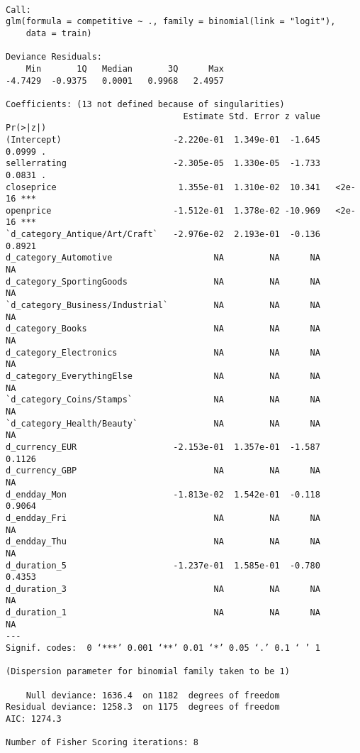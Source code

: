 \documentclass[11pt]{article}
\begin{document}
    
    \begin{verbatim}

Call:
glm(formula = competitive ~ ., family = binomial(link = "logit"), 
    data = train)

Deviance Residuals: 
    Min       1Q   Median       3Q      Max  
-4.7429  -0.9375   0.0001   0.9968   2.4957  

Coefficients: (13 not defined because of singularities)
                                   Estimate Std. Error z value Pr(>|z|)    
(Intercept)                      -2.220e-01  1.349e-01  -1.645   0.0999 .  
sellerrating                     -2.305e-05  1.330e-05  -1.733   0.0831 .  
closeprice                        1.355e-01  1.310e-02  10.341   <2e-16 ***
openprice                        -1.512e-01  1.378e-02 -10.969   <2e-16 ***
`d_category_Antique/Art/Craft`   -2.976e-02  2.193e-01  -0.136   0.8921    
d_category_Automotive                    NA         NA      NA       NA    
d_category_SportingGoods                 NA         NA      NA       NA    
`d_category_Business/Industrial`         NA         NA      NA       NA    
d_category_Books                         NA         NA      NA       NA    
d_category_Electronics                   NA         NA      NA       NA    
d_category_EverythingElse                NA         NA      NA       NA    
`d_category_Coins/Stamps`                NA         NA      NA       NA    
`d_category_Health/Beauty`               NA         NA      NA       NA    
d_currency_EUR                   -2.153e-01  1.357e-01  -1.587   0.1126    
d_currency_GBP                           NA         NA      NA       NA    
d_endday_Mon                     -1.813e-02  1.542e-01  -0.118   0.9064    
d_endday_Fri                             NA         NA      NA       NA    
d_endday_Thu                             NA         NA      NA       NA    
d_duration_5                     -1.237e-01  1.585e-01  -0.780   0.4353    
d_duration_3                             NA         NA      NA       NA    
d_duration_1                             NA         NA      NA       NA    
---
Signif. codes:  0 ‘***’ 0.001 ‘**’ 0.01 ‘*’ 0.05 ‘.’ 0.1 ‘ ’ 1

(Dispersion parameter for binomial family taken to be 1)

    Null deviance: 1636.4  on 1182  degrees of freedom
Residual deviance: 1258.3  on 1175  degrees of freedom
AIC: 1274.3

Number of Fisher Scoring iterations: 8

    \end{verbatim}
\end{document}
